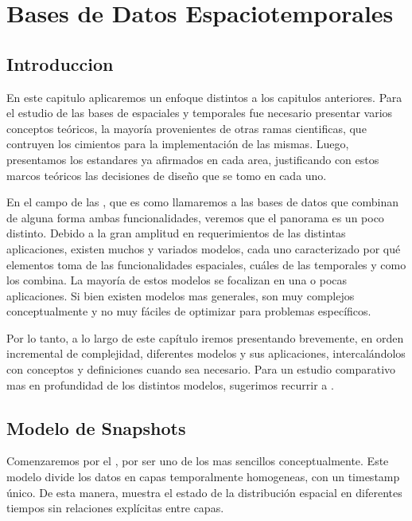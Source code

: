 \usepackage[utf8]{inputenc}
\chapter{Bases de Datos Espaciotemporales}  \label{cap:et}

\section{Introduccion} \label{sec:st:intro}

En este capitulo aplicaremos un enfoque distintos a los capitulos anteriores.
Para el estudio de las bases de espaciales y temporales fue necesario presentar varios conceptos teóricos,
la mayoría provenientes de otras ramas cientificas,
que contruyen los cimientos para la implementación de las mismas.
Luego, presentamos los estandares ya afirmados en cada area,
justificando con estos marcos teóricos las decisiones de diseño que se tomo en cada uno.

En el campo de las ,
que es como llamaremos a las bases de datos que combinan de alguna forma ambas funcionalidades,
veremos que el panorama es un poco distinto.
Debido a la gran amplitud en requerimientos de las distintas aplicaciones,
existen muchos y variados modelos, cada uno caracterizado por
qué elementos toma de las funcionalidades espaciales, cuáles de las temporales y como los combina.
La mayoría de estos modelos se focalizan en una o pocas aplicaciones.
Si bien existen modelos mas generales, son muy complejos conceptualmente
y no muy fáciles de optimizar para problemas específicos.

Por lo tanto, a lo largo de este capítulo iremos presentando brevemente, en orden incremental de complejidad,
diferentes modelos y sus aplicaciones, intercalándolos con conceptos y definiciones cuando sea necesario.
Para un estudio comparativo mas en profundidad de los distintos modelos, sugerimos recurrir a \cite{sp:litreview}.

\section{Modelo de Snapshots}

Comenzaremos por el \textsuperscript{\cite{sp:snapshot}}, por ser uno de los mas sencillos conceptualmente.
Este modelo divide los datos en capas temporalmente homogeneas, con un timestamp único.
De esta manera, muestra el estado de la distribución espacial en diferentes tiempos sin relaciones explícitas entre capas.

